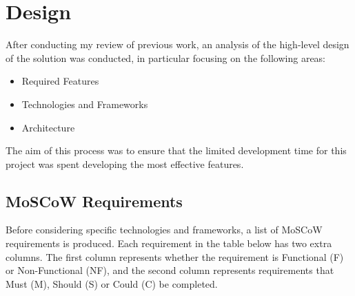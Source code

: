 \chapter{Design}\label{cha:design}
After conducting my review of previous work, an analysis of the high-level design of the solution was conducted, in particular focusing on the following areas:
\begin{itemize}
	\item Required Features
	\item Technologies and Frameworks
	\item Architecture
\end{itemize}

The aim of this process was to ensure that the limited development time for this project was spent developing the most effective features.

\section{MoSCoW Requirements}

Before considering specific technologies and frameworks, a list of MoSCoW requirements is produced. Each requirement in the table below has two extra columns. The first column represents whether the requirement is Functional (F) or Non-Functional (NF), and the second column represents requirements that Must (M), Should (S) or Could (C) be completed.


